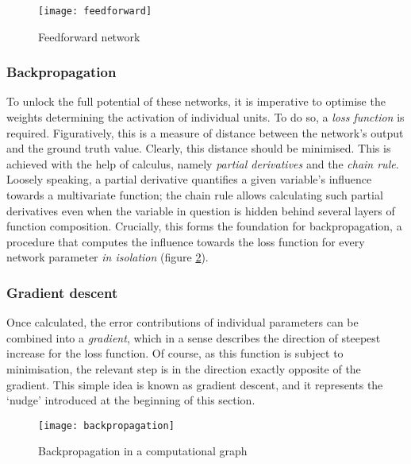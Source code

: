\documentclass[../../report.tex]{subfiles}
\begin{document}
\begin{figure}
  \centering
  \texttt{[image: feedforward]}
  \caption{Feedforward network}
  \label{fig:feedforward}
\end{figure}

\subsubsection{Backpropagation}
To unlock the full potential of these networks, it is imperative to optimise the
weights determining the activation of individual units. To do so, a \emph{loss
function} is required. Figuratively, this is a measure of distance between the
network's output and the ground truth value. Clearly, this distance should be
minimised. This is achieved with the help of calculus, namely \emph{partial
derivatives} and the \emph{chain rule}. Loosely speaking, a partial derivative
quantifies a given variable's influence towards a multivariate function; the
chain rule allows calculating such partial derivatives even when the variable in
question is hidden behind several layers of function composition. Crucially,
this forms the foundation for backpropagation, a procedure that computes the
influence towards the loss function for every network parameter \emph{in
isolation} (figure \ref{fig:backpropagation}).

\subsubsection{Gradient descent}
Once calculated, the error contributions of individual parameters can be
combined into a \emph{gradient}, which in a sense describes the direction of
steepest increase\footnotemark{} for the loss function. Of course, as this
function is subject to minimisation, the relevant step is in the direction
exactly opposite of the gradient. This simple idea is known as gradient descent,
and it represents the `nudge' introduced at the beginning of this section.


\begin{figure}
  \centering
  \texttt{[image: backpropagation]}
  \caption{Backpropagation in a computational graph \cite{Olah2015Backprop}}
  \label{fig:backpropagation}
\end{figure}
\end{document}
